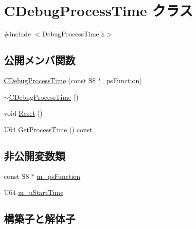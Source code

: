 \hypertarget{class_c_debug_process_time}{}\section{C\+Debug\+Process\+Time クラス}
\label{class_c_debug_process_time}


{\ttfamily \#include $<$Debug\+Process\+Time.\+h$>$}

\subsection*{公開メンバ関数}
\begin{DoxyCompactItemize}
\item 
\hyperlink{class_c_debug_process_time_acfd9d897cfacd9c37f1b95921052c4d7}{C\+Debug\+Process\+Time} (const S8 $\ast$\+\_\+ps\+Function)
\item 
\hyperlink{class_c_debug_process_time_a39ccc95264adb9a18093b20dfc34f2c7}{$\sim$\+C\+Debug\+Process\+Time} ()
\item 
void \hyperlink{class_c_debug_process_time_af324f580c88fc3ee4e3e953916bc6835}{Reset} ()
\item 
U64 \hyperlink{class_c_debug_process_time_a888bf783d5d5a25517ef29fc6bb13b87}{Get\+Process\+Time} () const 
\end{DoxyCompactItemize}
\subsection*{非公開変数類}
\begin{DoxyCompactItemize}
\item 
const S8 $\ast$ \hyperlink{class_c_debug_process_time_ae749da6a0425559cc94c16b0539eb0db}{m\+\_\+ps\+Function}
\item 
U64 \hyperlink{class_c_debug_process_time_ae521d38084feca1cbd666964c50113a2}{m\+\_\+u\+Start\+Time}
\end{DoxyCompactItemize}


\subsection{構築子と解体子}
\hypertarget{class_c_debug_process_time_acfd9d897cfacd9c37f1b95921052c4d7}{}
